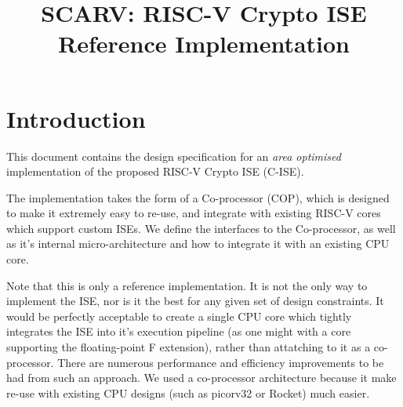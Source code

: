 \documentclass{article}
\title{SCARV: RISC-V Crypto ISE \\ Reference Implementation}
\begin{document}


\newcommand{\SIGNALS}[3]{
\begin{table}[H]
\begin{tabularx}{\textwidth}{@{} c c l Y @{}}
\toprule
\textbf{I/O} & \textbf{Size} & \textbf{Name} & \textbf{Description} \\
\midrule
#1
\bottomrule
\end{tabularx}
\caption{#2}
\label{#3}
\end{table}
}
\newcommand{\SIGREF}[1]{{\tt #1}}
\newcommand{\SIGNALI}[3]{
    {\bf I} & $#1$ &{\tt #2}& #3 \\ \addlinespace
}
\newcommand{\SIGNALO}[3]{
    {\bf O} & $#1$ &{\tt #2}& #3 \\ \addlinespace
}


\maketitle

\tableofcontents

\section{Introduction}

This document contains the design specification for an {\em area optimised}
implementation of the proposed RISC-V Crypto ISE (C-ISE).

The implementation takes the form of a Co-processor (COP), which is designed
to make it extremely easy to re-use, and integrate with existing RISC-V cores
which support custom ISEs. We define the interfaces to the Co-processor, as
well as it's internal micro-architecture and how to integrate it with an
existing CPU core.

Note that this is only a reference implementation. It is not the only way
to implement the ISE, nor is it the best for any given set of design
constraints. It would be perfectly acceptable to create a single CPU core
which tightly integrates the ISE into it's execution pipeline (as one might
with a core supporting the floating-point F extension), rather than
attatching to it as a co-processor. There are numerous performance and
efficiency improvements to be had from such an approach. We used a
co-processor architecture because it make re-use with existing CPU designs
(such as picorv32 or Rocket) much easier.
\end{document}
